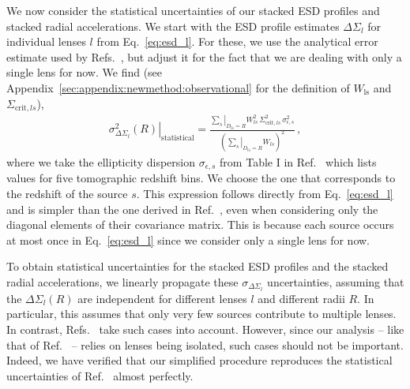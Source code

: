 \documentclass[a4paper,11pt]{article}
\begin{document}
We now consider the statistical uncertainties of our stacked ESD profiles and stacked radial accelerations.
We start with the ESD profile estimates $\Delta \Sigma_l$ for individual lenses $l$ from Eq.~\eqref{eq:esd_l}.
For these, we use the analytical error estimate used by Refs.~\cite{Brouwer2021,Viola2015}, but adjust it for the fact that we are dealing with only a single lens for now.
We find (see Appendix~\ref{sec:appendix:newmethod:observational} for the definition of $W_{\mathrm{ls}}$ and $\Sigma_{\mathrm{crit},ls}$),
\begin{align}
 \label{eq:sigma_esd_l}
 \left. \sigma_{\Delta \Sigma_l}^2(R)\right|_{\mathrm{statistical}} = \frac{\left.\sum_s \right|_{D_{ls} = R} W_{ls}^2 \, \Sigma_{\mathrm{crit},ls}^2 \, \sigma_{\epsilon,s}^2}{\left( \left. \sum_s \right|_{D_{ls} = R} W_{ls} \right)^2} \,,
\end{align}
where we take the ellipticity dispersion $\sigma_{\epsilon,s}$ from Table I in Ref.~\cite{Giblin2021} which lists values for five tomographic redshift bins.
We choose the one that corresponds to the redshift of the source $s$.
This expression follows directly from Eq.~\eqref{eq:esd_l} and is simpler than the one derived in Ref.~\cite{Viola2015}, even when considering only the diagonal elements of their covariance matrix.
This is because each source occurs at most once in Eq.~\eqref{eq:esd_l} since we consider only a single lens for now.

To obtain statistical uncertainties for the stacked ESD profiles and the stacked radial accelerations, we linearly propagate these $\sigma_{\Delta \Sigma_l}$ uncertainties, assuming that the $\Delta \Sigma_l(R)$ are independent for different lenses $l$ and different radii $R$.
In particular, this assumes that only very few sources contribute to multiple lenses.
In contrast, Refs.~\cite{Brouwer2021,Viola2015} take such cases into account.
However, since our analysis -- like that of Ref.~\cite{Brouwer2021} -- relies on lenses being isolated, such cases should not be important.
Indeed, we have verified that our simplified procedure reproduces the statistical uncertainties of Ref.~\cite{Brouwer2021} almost perfectly.
\end{document}
